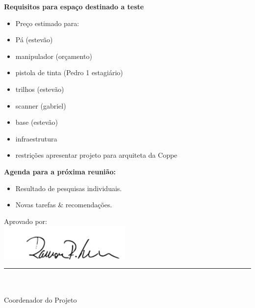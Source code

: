 				
\item \textbf{Requisitos para espaço destinado a teste}
			\begin{itemize} 
			    \item Preço estimado para:
			    \item Pá (estevão)
			    \item manipulador (orçamento)
				\item pistola de tinta (Pedro 1 estagiário)
				\item trilhos (estevão)
				\item scanner (gabriel)
				\item base (estevão)
				\item infraestrutura
   				\item restrições apresentar projeto para arquiteta da Coppe
   			\end{itemize}	




\textbf{Agenda para a próxima reunião:}
  \begin{itemize}
    \item Resultado de pesquisas individuais.
    \item Novas tarefas \& recomendações.
  \end{itemize}


\vspace{5mm}%
\parbox[t]{70mm}{
  Aprovado por: \\[5mm]
  \centering
  \includegraphics[width=65mm]{figs/logo/assinatura-ramon.png} \\[-4mm]
  \rule[2mm]{70mm}{0.1mm} \\
  \ramon \\[1mm]
  Coordenador do Projeto \\
}

\fim